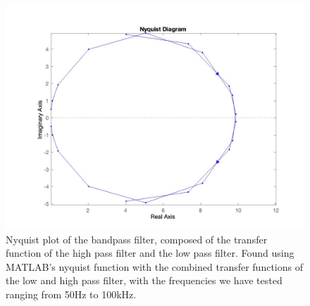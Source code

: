 \begin{figure}[H]
    \centering
    \includegraphics[scale=0.3]{images/nyquist_plot_bandpass.jpg}
    \caption{Nyquist plot of the bandpass filter, composed of the transfer function of the high pass filter and the low pass filter. Found using MATLAB's nyquist function with the combined transfer functions of the low and high pass filter, with the frequencies we have tested ranging from 50Hz to 100kHz.}
\end{figure}
